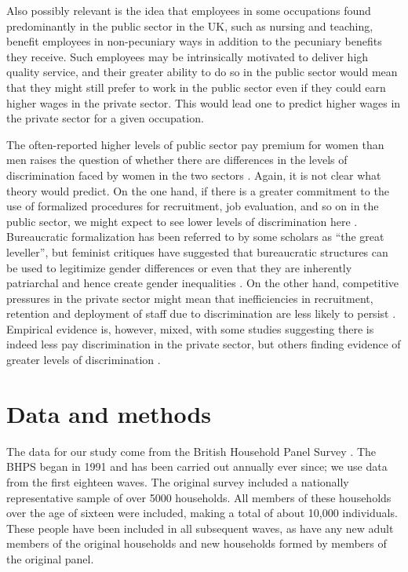 \documentclass[a4paper,11pt,titlepage]{article}
\begin{document}
Also possibly relevant is the idea that employees in some occupations found predominantly in the public sector in the UK, such as nursing and teaching, benefit employees in non-pecuniary ways in addition to the pecuniary benefits they receive.  Such employees may be intrinsically motivated to deliver high quality service, and their greater ability to do so in the public sector would mean that they might still prefer to work in the public sector even if they could earn higher wages in the private sector.  This would lead one to predict higher wages in the private sector for a given occupation.

The often-reported higher levels of public sector pay premium for women than men raises the question of whether there are differences in the levels of discrimination faced by women in the two sectors \citep{Byron2010}.  Again, it is not clear what theory would predict.  On the one hand, if there is a greater commitment to the use of formalized procedures for recruitment, job evaluation, and so on in the public sector, we might expect to see lower levels of discrimination here \citep{Kaufman2002}. Bureaucratic formalization has been referred to by some scholars as ``the great leveller'', but feminist critiques have suggested that bureaucratic structures can be used to legitimize gender differences or even that they are inherently patriarchal and hence create gender inequalities \citep{Baron2007}.   On the other hand, competitive pressures in the private sector might mean that inefficiencies in recruitment, retention and deployment of staff due to discrimination are less likely to persist \citep{Becker1971}.  Empirical evidence is, however, mixed, with some studies suggesting there is indeed less pay discrimination in the private sector, but others finding evidence of greater levels of discrimination \citep{Byron2010}.


\section{Data and methods}

The data for our study come from the British Household Panel Survey \citep{Taylor2010}.  The BHPS began in 1991 and has been carried out annually ever since; we use data from the first eighteen waves.  The original survey included a nationally representative sample of over 5000 households.  All members of these households over the age of sixteen were included, making a total of about 10,000 individuals.  These people have been included in all subsequent waves, as have any new adult members of the original households and new households formed by members of the original panel.
\end{document}
